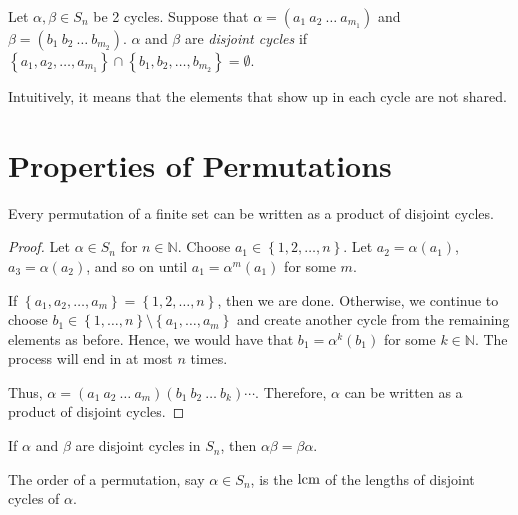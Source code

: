 \begin{definition}
    Let \(\alpha, \beta \in S_n\) be 2 cycles. Suppose that \(\alpha = (a_1\ a_2\ \ldots\ a_{m_1})\) and \(\beta = (b_1\ b_2\ \ldots\ b_{m_2})\). \(\alpha\) and \(\beta\) are \textit{disjoint cycles} if \(\left\{a_1, a_2, \ldots, a_{m_1}\right\} \cap \left\{b_1, b_2, \ldots, b_{m_2}\right\} = \emptyset\). 

    Intuitively, it means that the elements that show up in each cycle are not shared.
\end{definition}

\section{Properties of Permutations}

\begin{theorem}\label{thm:five-one}
    Every permutation of a finite set can be written as a product of disjoint cycles.
\end{theorem}

\begin{proof}
    Let \(\alpha \in S_n\) for \(n \in \mathbb{N}\). Choose \(a_1 \in \left\{1, 2, \ldots, n\right\}\). Let \(a_2 = \alpha(a_1)\), \(a_3 = \alpha(a_2)\), and so on until  \(a_1 = \alpha^m(a_1)\) for some \(m\). 
    
    If \(\left\{a_1, a_2, \ldots, a_m\right\} = \left\{1, 2, \ldots, n\right\}\), then we are done. Otherwise, we continue to choose \(b_1 \in \left\{1, \ldots, n\right\} \setminus \left\{a_1, \ldots, a_m\right\}\) and create another cycle from the remaining elements as before. Hence, we would have that \(b_1 = \alpha^k(b_1)\) for some \(k \in \mathbb{N}\). The process will end in at most \(n\) times.

    Thus, \(\alpha = (a_1\ a_2\ \ldots\ a_m)(b_1\ b_2\ \ldots\ b_k) \cdots\). Therefore, \(\alpha\) can be written as a product of disjoint cycles.
\end{proof}

\begin{theorem}\label{thm:five-two}
    If \(\alpha\) and \(\beta\) are disjoint cycles in \(S_n\), then \(\alpha\beta = \beta\alpha\).
\end{theorem}

\begin{theorem}
    The order of a permutation, say \(\alpha \in S_n\), is the \(\operatorname{lcm}\) of the lengths of disjoint cycles of \(\alpha\).
\end{theorem}

